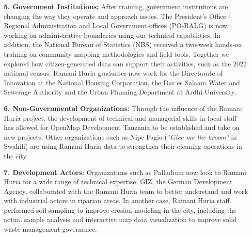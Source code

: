 \documentclass[a4paper,12pt,twoside]{article}
\begin{document}
\begin{multicols}{2}
\textbf{5. Government Institutions:} After training, government institutions are changing the way they operate and approach issues. The President's Office - Regional Administration and Local Government offices (PO-RALG) is now working on administrative boundaries using our technical capabilities. In addition, the National Bureau of Statistics (NBS) received a two-week hands-on  training on community mapping methodologies and field tools. Together we explored how citizen-generated data can support their activities, such as the 2022 national census. Ramani Huria graduates now work for the Directorate of Innovation at the National Housing Corporation, the Dar es Salaam Water and Sewerage Authority and the Urban Planning Department at Ardhi University.   

\textbf{6. Non-Governmental Organizations:} Through the influence of the Ramani Huria project, the development of technical and managerial skills in local staff has allowed for OpenMap Development Tanzania to be established and take on new projects. Other organizations such as Nipe Fagio (\textit{"Give me the broom"} in Swahili) are using Ramani Huria data to strengthen their cleaning operations in the city.

\textbf{7. Development Actors:} Organizations such as Palladium now look to Ramani Huria for a wide range of technical expertise. GIZ, the German Development Agency, collaborated with the Ramani Huria team to better understand and work with industrial actors in riparian areas. In another case, Ramani Huria staff performed soil sampling to improve erosion modeling in the city, including the actual sample analysis and interactive map data visualization to improve solid waste management governance. \end{multicols}  


\newpage
\end{document}
